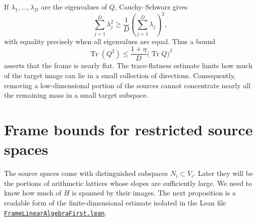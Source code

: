 \documentclass[11pt,openany,oneside]{scrbook}
\theoremstyle{definition}
\theoremstyle{remark}
\newcommand{\baseurl}{https://github.com/CocoSgt/riemann-hypothesis-lean/blob/7cbf7a0c32fca1badf05931879a37c3f8a2b03b4/}
\newcommand{\sourcefile}[2]{\href{\baseurl#1}{\texttt{#2}}}
\begin{document}
If $\lambda_1,\ldots,\lambda_D$ are the eigenvalues of $Q$, Cauchy--Schwarz gives
\[
\sum_{j=1}^D\lambda_j^2\ge\frac1D\left(\sum_{j=1}^D\lambda_j\right)^2,
\]
with equality precisely when all eigenvalues are equal.  Thus a bound
\begin{equation}\label{eq:frame-flatness}
\operatorname{Tr}(Q^2)\le\frac{1+\eta}{D}\bigl(\operatorname{Tr}Q\bigr)^2
\end{equation}
asserts that the frame is nearly flat.  The trace-flatness estimate limits how much of the target image can lie in a small collection of directions.  Consequently, removing a low-dimensional portion of the sources cannot concentrate nearly all the remaining mass in a small target subspace.

\section{Frame bounds for restricted source spaces}\label{sec:frame-lemma}

The source spaces come with distinguished subspaces $N_i\subset V_i$.  Later they will be the portions of arithmetic lattices whose slopes are sufficiently large.  We need to know how much of $H$ is spanned by their images.  The next proposition is a readable form of the finite-dimensional estimate isolated in the Lean file
\sourcefile{src/Formalism/HarderNarasimhan/HarderNarasimhanProofs/FrameLinearAlgebraFirst.lean}{FrameLinearAlgebraFirst.lean}.
\end{document}
